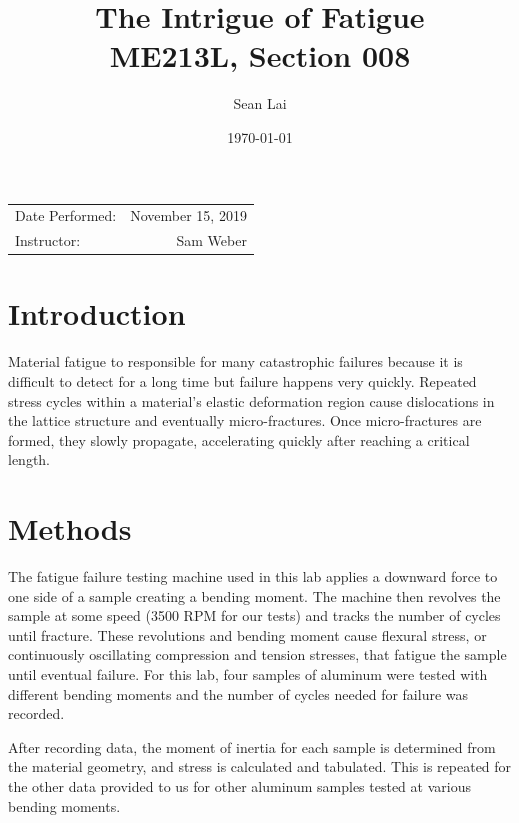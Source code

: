 \documentclass{article}
\title{The Intrigue of Fatigue\\ ME213L, Section 008}
\author{Sean Lai} %
\date{\today} %
\begin{document}
\maketitle %

\begin{center}
\begin{tabular}{l r}
Date Performed: & November 15, 2019 \\ %

Instructor: & Sam Weber %
\end{tabular}
\end{center}


\section{Introduction}
Material fatigue to responsible for many catastrophic failures because it is difficult to detect for a long time but failure happens very quickly. Repeated stress cycles within a material's elastic deformation region cause dislocations in the lattice structure and eventually micro-fractures. Once micro-fractures are formed,  they slowly propagate, accelerating quickly after reaching a critical length.
\section{Methods}
The fatigue failure testing machine used in this lab applies a downward force to one side of a sample creating a bending moment. The machine then revolves the sample at some speed (3500 RPM for our tests) and tracks the number of cycles until fracture. These revolutions and bending moment cause flexural stress, or continuously oscillating compression and tension stresses, that fatigue the sample until eventual failure. For this lab, four samples of aluminum were tested with different bending moments and the number of cycles needed for failure was recorded.

\vspace{1em}
After recording data, the moment of inertia for each sample is determined from the material geometry, and stress is calculated and tabulated. This is repeated for the other data provided to us for other aluminum samples tested at various bending moments.
\end{document}
